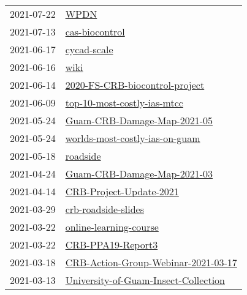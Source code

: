 \begin{longtable}{ll}
2021-07-22 &                                                                 \href{https://github.com/aubreymoore/WPDN}{WPDN} \\
2021-07-13 &                                             \href{https://github.com/aubreymoore/cas-biocontrol}{cas-biocontrol} \\
2021-06-17 &                                                   \href{https://github.com/aubreymoore/cycad-scale}{cycad-scale} \\
2021-06-16 &                                                                 \href{https://github.com/aubreymoore/wiki}{wiki} \\
2021-06-14 &             \href{https://github.com/aubreymoore/2020-FS-CRB-biocontrol-project}{2020-FS-CRB-biocontrol-project} \\
2021-06-09 &                   \href{https://github.com/aubreymoore/top-10-most-costly-ias-mtcc}{top-10-most-costly-ias-mtcc} \\
2021-05-24 &                   \href{https://github.com/aubreymoore/Guam-CRB-Damage-Map-2021-05}{Guam-CRB-Damage-Map-2021-05} \\
2021-05-24 &             \href{https://github.com/aubreymoore/worlds-most-costly-ias-on-guam}{worlds-most-costly-ias-on-guam} \\
2021-05-18 &                                                         \href{https://github.com/aubreymoore/roadside}{roadside} \\
2021-04-24 &                   \href{https://github.com/aubreymoore/Guam-CRB-Damage-Map-2021-03}{Guam-CRB-Damage-Map-2021-03} \\
2021-04-14 &                           \href{https://github.com/aubreymoore/CRB-Project-Update-2021}{CRB-Project-Update-2021} \\
2021-03-29 &                                   \href{https://github.com/aubreymoore/crb-roadside-slides}{crb-roadside-slides} \\
2021-03-22 &                             \href{https://github.com/aubreymoore/online-learning-course}{online-learning-course} \\
2021-03-22 &                                       \href{https://github.com/aubreymoore/CRB-PPA19-Report3}{CRB-PPA19-Report3} \\
2021-03-18 &   \href{https://github.com/aubreymoore/CRB-Action-Group-Webinar-2021-03-17}{CRB-Action-Group-Webinar-2021-03-17} \\
2021-03-13 & \href{https://github.com/aubreymoore/University-of-Guam-Insect-Collection}{University-of-Guam-Insect-Collection} \\

\end{longtable}
